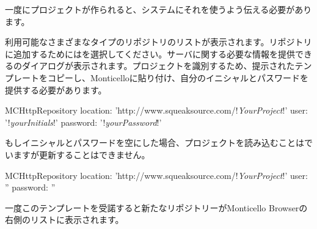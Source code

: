 \documentclass[a4paper,10pt,twoside]{book}
\begin{document}
一度\sqsrc にプロジェクトが作られると、\pharo システムにそれを使うよう伝える必要があります。

  利用可能なさまざまなタイプのリポジトリのリストが表示されます。\sqsrc リポジトリに追加するためにはを選択してください。サーバに関する必要な情報を提供できるのダイアログが表示されます。\sqsrc プロジェクトを識別するため、提示されたテンプレートをコピーし、Monticelloに貼り付け、自分のイニシャルとパスワードを提供する必要があります。

\begin{code}{}
MCHttpRepository
    location: 'http://www.squeaksource.com/!\emph{YourProject}!'
    user: '!\emph{yourInitials}!'
    password: '!\emph{yourPassword}!'
\end{code}

\noindent
もしイニシャルとパスワードを空にした場合、プロジェクトを読み込むことはでいますが更新することはできません。

\begin{code}{}
MCHttpRepository
    location: 'http://www.squeaksource.com/!\emph{YourProject}!'
    user: ''
    password: ''
\end{code}

一度このテンプレートを受諾すると新たなリポジトリーがMonticello Browserの右側のリストに表示されます。
\end{document}
